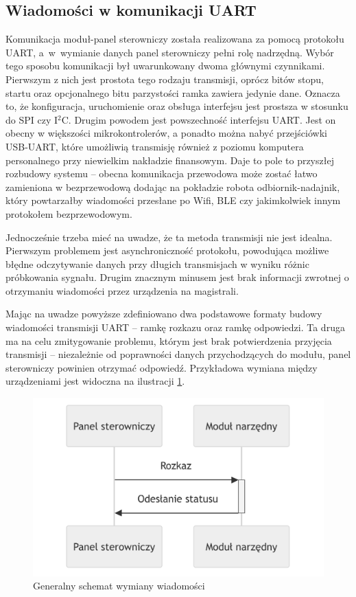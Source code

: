 \subsection{Wiadomości w komunikacji UART}
Komunikacja moduł-panel sterowniczy została realizowana za pomocą protokołu UART, a~w~wymianie danych panel sterowniczy pełni rolę nadrzędną. Wybór tego sposobu komunikacji był uwarunkowany dwoma głównymi czynnikami. Pierwszym z nich jest prostota tego rodzaju transmisji, oprócz bitów stopu, startu oraz opcjonalnego bitu parzystości ramka zawiera jedynie dane. Oznacza to, że konfiguracja, uruchomienie oraz obsługa interfejsu jest prostsza w stosunku do SPI czy I$^2$C. Drugim powodem jest powszechność interfejsu UART. Jest on obecny w większości mikrokontrolerów, a ponadto można nabyć przejściówki USB-UART, które umożliwią transmisję również z poziomu komputera personalnego przy niewielkim nakładzie finansowym. Daje to pole to przyszłej rozbudowy systemu -- obecna komunikacja przewodowa może zostać łatwo zamieniona w bezprzewodową dodając na pokładzie robota odbiornik-nadajnik, który powtarzałby wiadomości przesłane po Wifi, BLE czy jakimkolwiek innym protokołem bezprzewodowym. 

Jednocześnie trzeba mieć na uwadze, że ta metoda transmisji nie jest idealna. Pierwszym problemem jest asynchroniczność protokołu, powodująca możliwe błędne odczytywanie danych przy długich transmisjach w wyniku różnic próbkowania sygnału. Drugim znacznym minusem jest brak informacji zwrotnej o otrzymaniu wiadomości przez urządzenia na magistrali. 

Mając na uwadze powyższe zdefiniowano dwa podstawowe formaty budowy wiadomości transmisji UART -- ramkę rozkazu oraz ramkę odpowiedzi. Ta druga ma na celu zmitygowanie problemu, którym jest brak potwierdzenia przyjęcia transmisji -- niezależnie od poprawności danych przychodzących do modułu, panel sterowniczy powinien otrzymać odpowiedź. Przykładowa wymiana między urządzeniami jest widoczna na ilustracji \ref{fig: gen_uart_frame}.

    \begin{figure}[ht!]
        \centering
        \includegraphics[width=0.6\linewidth]{rysunki/basic_com/uart_tx_rx.pdf}
        \caption{Generalny schemat wymiany wiadomości}
        \label{fig: gen_uart_frame}
    \end{figure} 


